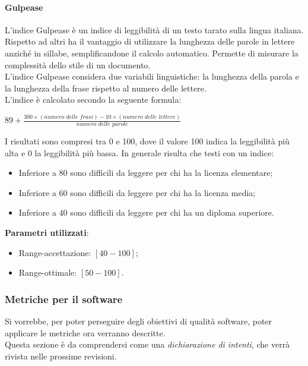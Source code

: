 \paragraph{Gulpease}
L'indice Gulpease è un indice di leggibilità di un testo tarato sulla lingua italiana.\\
Rispetto ad altri ha il vantaggio di utilizzare la lunghezza delle parole in lettere anziché in sillabe, semplificandone il calcolo automatico. Permette di misurare la complessità dello stile di un documento.\\
L'indice Gulpease considera due variabili linguistiche: la lunghezza della parola e la lunghezza della frase rispetto al numero delle lettere.\\
L'indice è calcolato secondo la seguente formula:
\begin{center}
$89+\frac{300\times(\textit{numero delle frasi})-10\times(\textit{numero delle lettere})}{\textit{numero delle parole}}$
\end{center}
I risultati sono compresi tra 0 e 100, dove il valore 100 indica la leggibilità più alta e 0 la leggibilità più bassa. In generale risulta che testi con un indice:
\begin{itemize}
\item Inferiore a 80 sono difficili da leggere per chi ha la licenza elementare;
\item Inferiore a 60 sono difficili da leggere per chi ha la licenza media;
\item Inferiore a 40 sono difficili da leggere per chi ha un diploma superiore.
\end{itemize}
\textbf{Parametri utilizzati}:
\begin{itemize}
\item Range-accettazione: $[40-100]$;
\item Range-ottimale: $[50-100]$.
\end{itemize}

\subsubsection{Metriche per il software}
Si vorrebbe, per poter perseguire degli obiettivi di qualità software, poter applicare le metriche ora verranno descritte.\\
Questa sezione è da comprendersi come una \textit{dichiarazione di intenti}, che verrà rivista nelle prossime revisioni.

